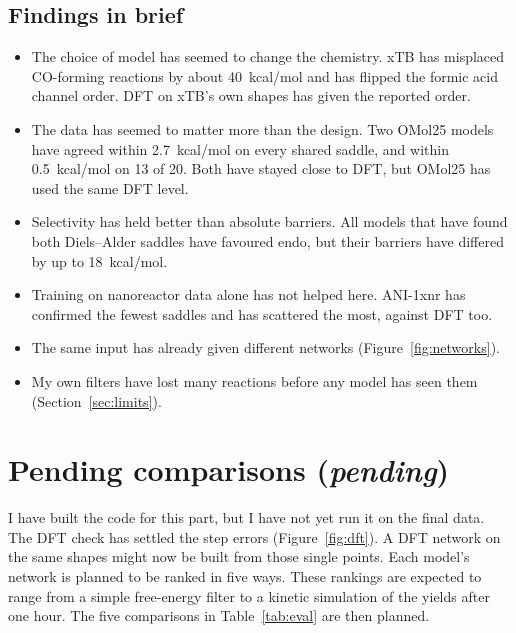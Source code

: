 \documentclass[11pt]{article}
\newcommand{\tba}[1][pending]{\textcolor{muted}{\emph{#1}}}
\newcommand{\kcal}{kcal/mol}
\begin{document}
\subsection{Findings in brief}

\begin{itemize}
\item The choice of model has seemed to change the chemistry. xTB has
misplaced CO-forming reactions by about 40~\kcal{} and has flipped the
formic acid channel order. DFT on xTB's own shapes has given the reported
order.
\item The data has seemed to matter more than the design. Two OMol25
models have agreed within 2.7~\kcal{} on every shared saddle, and within
0.5~\kcal{} on 13 of 20. Both have stayed close to DFT, but OMol25 has
used the same DFT level.
\item Selectivity has held better than absolute barriers. All models that
have found both Diels--Alder saddles have favoured endo, but their barriers
have differed by up to 18~\kcal{}.
\item Training on nanoreactor data alone has not helped here. ANI-1xnr has
confirmed the fewest saddles and has scattered the most, against DFT too.
\item The same input has already given different networks
(Figure~\ref{fig:networks}).
\item My own filters have lost many reactions before any model has seen
them (Section~\ref{sec:limits}).
\end{itemize}

\section{Pending comparisons (\tba)}
\label{sec:eval}

I have built the code for this part, but I have not yet run it on the
final data. The DFT check has settled the step errors
(Figure~\ref{fig:dft}). A DFT network on the same shapes might now be
built from those single points. Each model's network is
planned to be ranked in five ways. These rankings are expected to range
from a simple free-energy filter to a kinetic simulation of the yields
after one hour. The five comparisons in Table~\ref{tab:eval} are then
planned.
\end{document}
